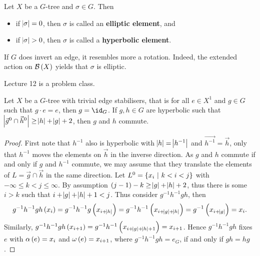 \begin{definition}
Let $ X $ be a $ G $-tree and $ \sigma \in G $. Then
\begin{itemize}
\item if $ \abs{\sigma} = 0 $, then $ \sigma $ is called an \textbf{elliptic element}, and
\item if $ \abs{\sigma} > 0 $, then $ \sigma $ is called a \textbf{hyperbolic element}.
\end{itemize}
\end{definition}

\begin{remark}
If $ G $ does invert an edge, it resembles more a rotation. Indeed, the extended action on $ \BBB\br{X} $ yields that $ \sigma $ is elliptic.
\end{remark}


Lecture 12 is a problem class.

\pagebreak


\begin{lemma}
Let $ X $ be a $ G $-tree with trivial edge stabilisers, that is for all $ e \in X^1 $ and $ g \in G $ such that $ g \cdot e = e $, then $ g = \id_G $. If $ g, h \in G $ are hyperbolic such that $ \abs{\vec{g}^0 \cap \vec{h}^0} \ge \abs{h} + \abs{g} + 2 $, then $ g $ and $ h $ commute.
\end{lemma}

\begin{proof}
First note that $ h^{-1} $ also is hyperbolic with $ \abs{h} = \abs{h^{-1}} $ and $ \vec{h^{-1}} = \vec{h} $, only that $ h^{-1} $ moves the elements on $ \vec{h} $ in the inverse direction. As $ g $ and $ h $ commute if and only if $ g $ and $ h^{-1} $ commute, we may assume that they translate the elements of $ L = \vec{g} \cap \vec{h} $ in the same direction. Let $ L^0 = \cbr{x_i \st k < i < j} $ with $ -\infty \le k < j \le \infty $. By assumption $ \br{j - 1} - k \ge \abs{g} + \abs{h} + 2 $, thus there is some $ i > k $ such that $ i + \abs{g} + \abs{h} + 1 < j $. Thus consider $ g^{-1}h^{-1}gh $, then
$$ g^{-1}h^{-1}gh\br{x_i} = g^{-1}h^{-1}g\br{x_{i + \abs{h}}} = g^{-1}h^{-1}\br{x_{i + \abs{g} + \abs{h}}} = g^{-1}\br{x_{i + \abs{g}}} = x_i. $$
Similarly, $ g^{-1}h^{-1}gh\br{x_{i + 1}} = g^{-1}h^{-1}\br{x_{i + \abs{g} + \abs{h} + 1}} = x_{i + 1} $. Hence $ g^{-1}h^{-1}gh $ fixes $ e $ with $ \alpha\br{e} = x_i $ and $ \omega\br{e} = x_{i + 1} $, where $ g^{-1}h^{-1}gh = e_G $, if and only if $ gh = hg $.
\end{proof}

